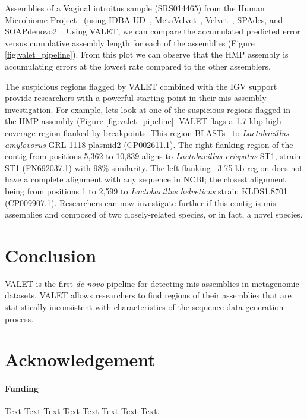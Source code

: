 \documentclass{bioinfo}
\begin{document}
Assemblies of a Vaginal introitus sample (SRS014465) from the Human Microbiome Project~\citep{human2012structure} (using IDBA-UD~\citep{peng2012idba}, MetaVelvet~\citep{namiki2012metavelvet}, Velvet~\citep{zerbino2008velvet}, SPAdes\citep{bankevich2012spades}, and SOAPdenovo2~\citep{luo2012soapdenovo2}.
Using VALET, we can compare the accumulated predicted error versus cumulative assembly length for each of the assemblies (Figure \ref{fig:valet_pipeline}).
From this plot we can observe that the HMP assembly is accumulating errors at the lowest rate compared to the other assemblers.

The suspicious regions flagged by VALET combined with the IGV support provide researchers with a powerful starting point in their mis-assembly investigation.
For example, lets look at one of the suspicious regions flagged in the HMP assembly (Figure \ref{fig:valet_pipeline}.
VALET flags a 1.7 kbp high coverage region flanked by breakpoints.
This region BLASTs~\citep{BLAST} to \emph{Lactobacillus amylovorus} GRL 1118 plasmid2 (CP002611.1).
The right flanking region of the contig from positions 5,362 to 10,839 aligns to \emph{Lactobacillus crispatus} ST1, strain ST1 (FN692037.1) with 98\% similarity.
The left flanking ~3.75 kb region does not have a complete alignment with any sequence in NCBI; the closest alignment being from positions 1 to 2,599 to \emph{Lactobacillus helveticus} strain KLDS1.8701 (CP009907.1).
Researchers can now investigate further if this contig is mis-assemblies and composed of two closely-related species, or in fact, a novel species.

\section{Conclusion}

VALET is the first \emph{de novo} pipeline for detecting mis-assemblies in metagenomic datasets.
VALET allows researchers to find regions of their assemblies that are statistically inconsistent with characteristics of the sequence data generation process.


\section*{Acknowledgement}

\paragraph{Funding\textcolon} Text Text Text Text Text Text  Text Text.


% 
% 
% 
% 




\end{document}
